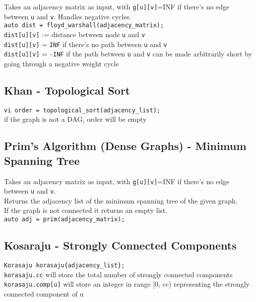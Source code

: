 Takes an adjacency matrix as input, with \verb|g[u][v]|=INF if there's no edge between \verb|u| and \verb|v|. Handles negative cycles. \\
\verb|auto dist = floyd_warshall(adjacency_matrix);| \\
\verb|dist[u][v]| := distance between node \verb|u| and \verb|v| \\
\verb|dist[u][v]| = \verb|INF| if there's no path between \verb|u| and \verb|v| \\
\verb|dist[u][v]| = \verb|-INF| if the path between \verb|u| and \verb|v| can be made arbitrarily short by going through a negative weight cycle



\subsection{Khan - Topological Sort}

\verb|vi order = topological_sort(adjacency_list);| \\
if the graph is not a DAG, order will be empty



\subsection{Prim's Algorithm (Dense Graphs) - Minimum Spanning Tree}

Takes an adjacency matrix as input, with \verb|g[u][v]|=INF if there's no edge between \verb|u| and \verb|v|. \\
Returns the adjacency list of the minimum spanning tree of the given graph. \\
If the graph is not connected it returns an empty list. \\
\verb|auto adj = prim(adjacency_matrix);| \\



\subsection{Kosaraju - Strongly Connected Components}

\verb|Korasaju korasaju{adjacency_list};| \\
\verb|korasaju.cc| will store the total number of strongly connected components \\
\verb|korasaju.comp[u]| will store an integer in range [0, cc) representing the strongly connected component of u

